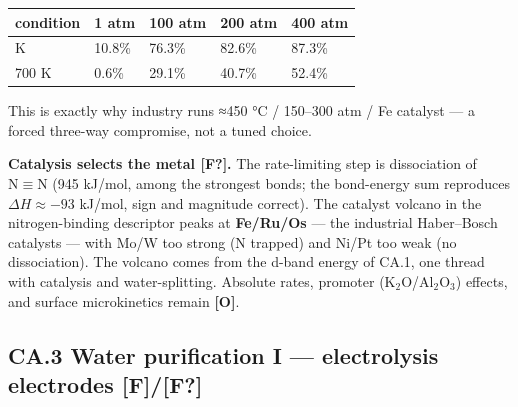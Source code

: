 \documentclass[
  10pt,
]{article}
\begin{document}
\begin{longtable}[]{@{}lllll@{}}
\toprule\noalign{}
condition & 1 atm & 100 atm & 200 atm & 400 atm \\
\midrule\noalign{}
\endhead
\bottomrule\noalign{}
\endlastfoot
500 K & 10.8\% & 76.3\% & 82.6\% & 87.3\% \\
700 K & 0.6\% & 29.1\% & 40.7\% & 52.4\% \\
\end{longtable}

This is exactly why industry runs ≈450 °C / 150--300 atm / Fe catalyst
--- a forced three-way compromise, not a tuned choice.

\textbf{Catalysis selects the metal {[}F?{]}.} The rate-limiting step is
dissociation of \(\mathrm{N\equiv N}\) (945 kJ/mol, among the strongest
bonds; the bond-energy sum reproduces \(\Delta H\approx-93\) kJ/mol,
sign and magnitude correct). The catalyst volcano in the
nitrogen-binding descriptor peaks at \textbf{Fe/Ru/Os} --- the
industrial Haber--Bosch catalysts --- with Mo/W too strong (N trapped)
and Ni/Pt too weak (no dissociation). The volcano comes from the d-band
energy of CA.1, one thread with catalysis and water-splitting. Absolute
rates, promoter (\(\mathrm{K_2O}\)/\(\mathrm{Al_2O_3}\)) effects, and
surface microkinetics remain \textbf{{[}O{]}}.

\hypertarget{ca.3-water-purification-i-electrolysis-electrodes-ff}{%
\subsection{\texorpdfstring{CA.3 Water purification I --- electrolysis
electrodes
\textbf{{[}F{]}/{[}F?{]}}}{CA.3 Water purification I --- electrolysis electrodes {[}F{]}/{[}F?{]}}}\label{ca.3-water-purification-i-electrolysis-electrodes-ff}}
\end{document}
